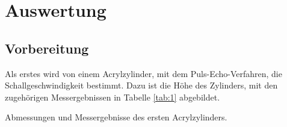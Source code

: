 \section{Auswertung}

\subsection{Vorbereitung}

Als erstes wird von einem Acrylzylinder, mit dem Puls-Echo-Verfahren, die Schallgeschwindigkeit
bestimmt. Dazu ist die Höhe des Zylinders, mit den zugehörigen Messergebnissen in
Tabelle \ref{tab:1} abgebildet.

\begin{table}[H]
  \centering
  \caption{Abmessungen und Messergebnisse des ersten Acrylzylinders.}
  \label{}

\end{table}
